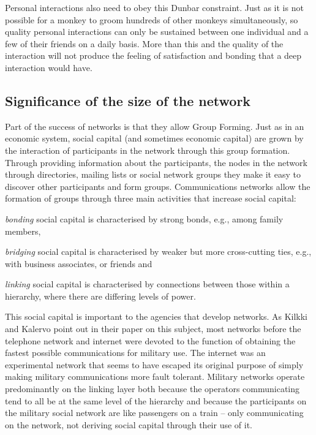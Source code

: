 Personal interactions also need to obey this Dunbar constraint. Just as it is not possible for a monkey to groom hundreds of other monkeys simultaneously, so quality personal interactions can only be sustained between one individual and a few of their friends on a daily basis. More than this and the quality of the interaction will not produce the feeling of satisfaction and bonding that a deep interaction would have. 

\subsection{Significance of the size of the network}
Part of the success of networks is that they allow Group Forming.  Just as in an economic system, social capital (and sometimes economic capital) are grown by the interaction of participants in the network through this group formation. Through providing information about the participants, the nodes in the network through directories, mailing lists or social network groups they make it easy to discover other participants and form groups. Communications networks allow the formation of groups through three main activities that increase social capital:
\begin{itemise}
\item \emph{bonding} social capital is characterised by strong bonds, e.g., among family members,
\item \emph{bridging} social capital is characterised by weaker but more cross-cutting ties, e.g., with business associates, or friends and
\item \emph{linking} social capital is characterised by connections between those within a hierarchy, where there are differing levels of power.\cite[p21]{RefWorks:296}
\end{itemise}

This social capital is important to the agencies that develop networks. As Kilkki and Kalervo point out in their paper on this subject, most networks before the telephone network and internet were devoted to the function of obtaining the fastest possible communications for military use. The internet was an experimental network that seems to have escaped its original purpose of simply making military communications more fault tolerant. Military networks operate predominantly on the linking layer both because the operators communicating tend to all be at the same level of the hierarchy and because the participants on the military social network are like passengers on a train -- only communicating on the network, not deriving social capital through their use of it.


